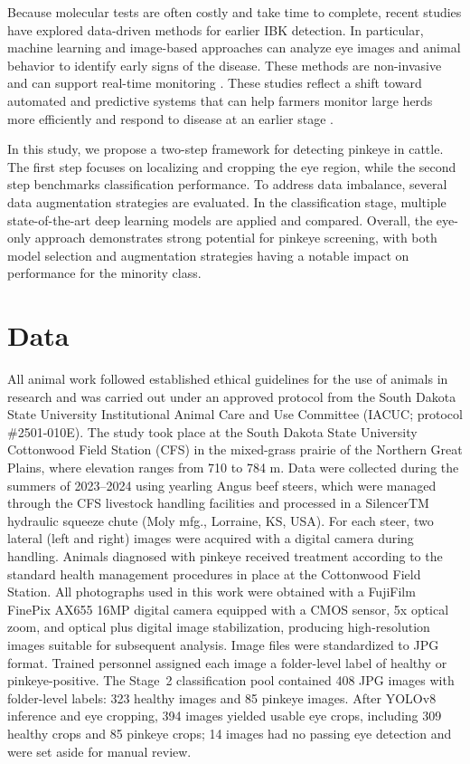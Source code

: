 \documentclass[preprint,12pt,authoryear]{elsarticle}
\begin{document}
Because molecular tests are often costly and take time to complete, recent studies have explored data-driven methods for earlier IBK detection. In particular, machine learning and image-based approaches can analyze eye images and animal behavior to identify early signs of the disease. These methods are non-invasive and can support real-time monitoring \citep{gupta2023, mahmud2021}. These studies reflect a shift toward automated and predictive systems that can help farmers monitor large herds more efficiently and respond to disease at an earlier stage \citep{mahmud2021, mia2025}.

In this study, we propose a two-step framework for detecting pinkeye in cattle. The first step focuses on localizing and cropping the eye region, while the second step benchmarks classification performance. To address data imbalance, several data augmentation strategies are evaluated. In the classification stage, multiple state-of-the-art deep learning models are applied and compared. Overall, the eye-only approach demonstrates strong potential for pinkeye screening, with both model selection and augmentation strategies having a notable impact on performance for the minority class.

\section{Data}
\label{dataset}

All animal work followed established ethical guidelines for the use of animals in research and was carried out under an approved protocol from the South Dakota State University Institutional Animal Care and Use Committee (IACUC; protocol \#2501-010E). The study took place at the South Dakota State University Cottonwood Field Station (CFS) in the mixed-grass prairie of the Northern Great Plains, where elevation ranges from 710 to 784 m. Data were collected during the summers of 2023–2024 using yearling Angus beef steers, which were managed through the CFS livestock handling facilities and processed in a SilencerTM hydraulic squeeze chute (Moly mfg., Lorraine, KS, USA). For each steer, two lateral (left and right) images were acquired with a digital camera during handling. Animals diagnosed with pinkeye received treatment according to the standard health management procedures in place at the Cottonwood Field Station. All photographs used in this work were obtained with a FujiFilm FinePix AX655 16MP digital camera equipped with a CMOS sensor, 5x optical zoom, and optical plus digital image stabilization, producing high-resolution images suitable for subsequent analysis. Image files were standardized to JPG format. Trained personnel assigned each image a folder-level label of healthy or pinkeye-positive. The Stage~2 classification pool contained 408 JPG images with folder-level labels: 323 healthy images and 85 pinkeye images. After YOLOv8 inference and eye cropping, 394 images yielded usable eye crops, including 309 healthy crops and 85 pinkeye crops; 14 images had no passing eye detection and were set aside for manual review.
\end{document}

